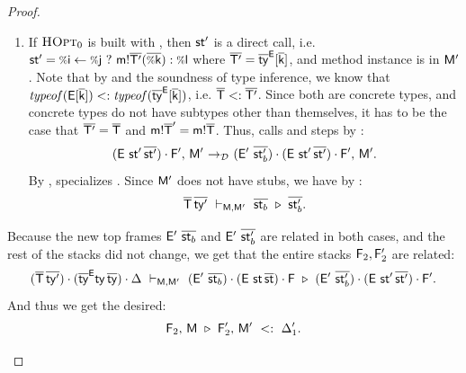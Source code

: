 {\begin{proof}
{\begin{itemize}
\begin{enumerate}
          Thus,  succeeds,
          and  steps by :
          \[
            \config{\stk{(\env\ \st\,\ol{\st'})}{\frm'}}{\mtbl'} \stepd
            \config{\stk{(\env'\ \ol{\st'_b})}{\stk{(\env\ \st\,\ol{\st'})}{\frm'}}}{\mtbl'}.
          \]
          There are two possibilities for .
          (a) If $\mtbl'$ does not contain a specialization, then
          $\ol{\st'_b} = \ol{\st_b}$. By reflexivity of the optimization relation,
          we then have:
          \[
            \eqstd
              {\ol\Ty\,\ol{\ty'}}
              {\ol{\st_b}}
              {\ol{\st_b}}.
          \]
          (b) If $\mtbl'$ contains a specialized method instance
          $\langle \meth\m{\ol{\Ty}}{}\ol{\st'_b},\ \ol{\ty_o} \rangle$,
          then $\ol{\st'_b} \neq \done$ by the assumption on $\mtbl'$,
          and thus the desired relation is guaranteed by :
          \[
            \eqstd
              {\ol\Ty\,\ol{\ty'}}
              {\ol{\st_b}}
              {\ol{\st'_b}}.
          \]

        \item If $\textsc{HOpt}_0$ is built with , then
          $\mathsf{st}'$ is a direct call, i.e.
          $\st' = \cond\i\j{\call{\msig{\m}{\ol{\Ty'}}}{\ol{\v k}}}{\v\l}$
          where $\overline{\mathsf{T}'} = \overline{\mathsf{ty}}^{\mathsf{E}}[{\mathsf{\overline{\mathsf{k}}}}]$,
          and method instance  is in $\mtbl'$.
          Note that by  and the soundness of type inference,
          we know that
          $\operatorname{\mathit{typeof}}(\mathsf{E}[{\mathsf{\overline{\mathsf{k}}}}]) <: \operatorname{\mathit{typeof}}(\overline{\mathsf{ty}}^{\mathsf{E}}[{\mathsf{\overline{\mathsf{k}}}}])$,
          i.e. $\overline{\mathsf{T}} <: \overline{\mathsf{T}'}$.
          Since both are concrete types, and concrete types do not have subtypes
          other than themselves, it has to be the case that $\overline{\mathsf{T}'} = \overline{\mathsf{T}}$
          and $\mathsf{m}!{\overline{\mathsf{T}}'} = \mathsf{m}!{\overline{\mathsf{T}}}$.
          Thus,  calls \msig{\m}{\ol\Ty} and
          steps by :
          \[
            \config{\stk{(\env\ \st'\,\ol{\st'})}{\frm'}}{\mtbl'} \stepd
            \config{(\env'\ \stk{\ol{\st'_b})}{\stk{(\env\ \st'\,\ol{\st'})}{\frm'}}}{\mtbl'}.
          \]
          By , \meth\m{\ol{\Ty}}{} specializes
          . Since $\mtbl'$ does not have stubs,
          we have by :
          \[
            \eqstd
              {\ol\Ty\,\ol{\ty'}}
              {\ol{\st_b}}
              {\ol{\st'_b}}.
          \]
      \end{enumerate}
      Because the new top frames $\env'\ \ol{\st_b}$ and
      $\env'\ \ol{\st'_b}$ are related in both cases, and the rest of
      the stacks did not change, we get that the entire stacks
      $\mathsf{F}_2, \mathsf{F}'_2$ are related:
      \[
        \eqstd
            {\stk{(\ol\Ty\,\ol{\ty'})}{\stk{(\ol\ty^\env \ty\,\ol\ty)}{\Delta}}}
            {\stk{(\env'\ \ol{\st_b })}{\stk{(\env\ \st \,\ol{\st })}{\frm }}}
            {\stk{(\env'\ \ol{\st'_b})}{\stk{(\env\ \st'\,\ol{\st'})}{\frm'}}}.
      \]
      And thus we get the desired:
      \[
        \mathsf{F}_2,\, \mathsf{M}\ \triangleright\ \mathsf{F}'_2,\, \mathsf{M}'\ <:\ \Delta'_1.
      \]


\end{itemize}}
\end{proof}}
